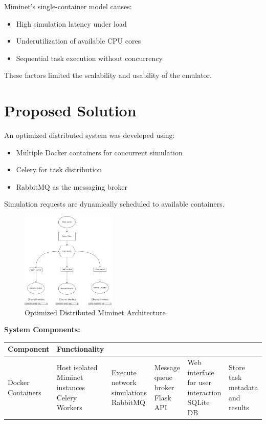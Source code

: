 \documentclass[14pt]{article}
\begin{document}
Miminet's\cite{miminet} single-container model causes:
\begin{itemize}
    \item High simulation latency under load
    \item Underutilization of available CPU cores
    \item Sequential task execution without concurrency
\end{itemize}
These factors limited the scalability and usability of the emulator.

\section{Proposed Solution}
An optimized distributed system was developed using:
\begin{itemize}
    \item Multiple Docker containers for concurrent simulation
    \item Celery\cite{celery} for task distribution
    \item RabbitMQ\cite{rabbitmq} as the messaging broker
\end{itemize}
Simulation requests are dynamically scheduled to available containers.

\begin{figure}[h!]
    \centering
    \includegraphics[width=0.4\textwidth]{example.png}
    \caption{Optimized Distributed Miminet Architecture}
\end{figure}

\vspace{10pt}
\noindent\textbf{System Components:}
\begin{tabularx}{\linewidth}{lX}
    \toprule
    Component & Functionality \\ \midrule
    Docker Containers & Host isolated Miminet\cite{miminet} instances \newline  \newline
    Celery\cite{celery} Workers & Execute network simulations \newline \newline
    RabbitMQ\cite{rabbitmq} & Message queue broker \newline \newline
    Flask API & Web interface for user interaction \newline \newline
    SQLite DB & Store task metadata and results \\ \bottomrule
\end{tabularx}
\end{document}
